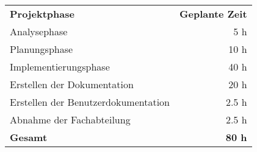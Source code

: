 \begin{tabular}{lr}
\rowcolor{heading}\textbf{Projektphase} & \textbf{Geplante Zeit} \\
Analysephase & 5 h \\
\rowcolor{odd}Planungsphase & 10 h \\
Implementierungsphase & 40 h \\
\rowcolor{odd}Erstellen der Dokumentation & 20 h \\
Erstellen der Benutzerdokumentation & 2.5 h \\
\rowcolor{odd}Abnahme der Fachabteilung & 2.5 h \\
\hline
\hline
\rowcolor{odd}\textbf{Gesamt} & \textbf{80 h} \\
\end{tabular}

